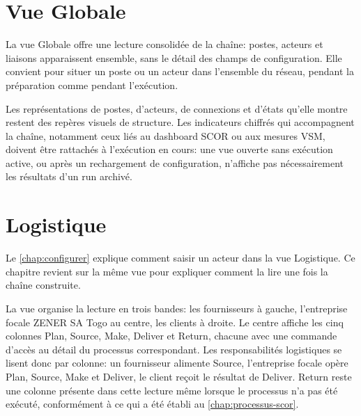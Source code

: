 \section{Vue Globale}

La vue Globale offre une lecture consolidée de la chaîne: postes, acteurs et liaisons apparaissent ensemble, sans le détail des champs de configuration. Elle convient pour situer un poste ou un acteur dans l'ensemble du réseau, pendant la préparation comme pendant l'exécution.


Les représentations de postes, d'acteurs, de connexions et d'états qu'elle montre restent des repères visuels de structure. Les indicateurs chiffrés qui accompagnent la chaîne, notamment ceux liés au dashboard SCOR ou aux mesures VSM, doivent être rattachés à l'exécution en cours: une vue ouverte sans exécution active, ou après un rechargement de configuration, n'affiche pas nécessairement les résultats d'un run archivé.


\section{Logistique}

Le \cref{chap:configurer} explique comment saisir un acteur dans la vue Logistique. Ce chapitre revient sur la même vue pour expliquer comment la lire une fois la chaîne construite.


La vue organise la lecture en trois bandes: les fournisseurs à gauche, l'entreprise focale ZENER SA Togo au centre, les clients à droite. Le centre affiche les cinq colonnes Plan, Source, Make, Deliver et Return, chacune avec une commande d'accès au détail du processus correspondant. Les responsabilités logistiques se lisent donc par colonne: un fournisseur alimente Source, l'entreprise focale opère Plan, Source, Make et Deliver, le client reçoit le résultat de Deliver. Return reste une colonne présente dans cette lecture même lorsque le processus n'a pas été exécuté, conformément à ce qui a été établi au \cref{chap:processus-scor}.


